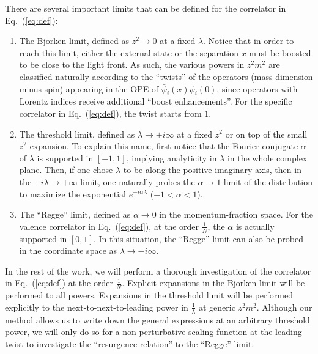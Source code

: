 \documentclass[a4paper,11pt]{article}
\begin{document}
There are several important limits that can be defined for the correlator in Eq.~(\ref{eq:def}):
\begin{enumerate}
    \item The Bjorken limit, defined as $z^2 \rightarrow 0$ at a fixed $\lambda$. Notice that in order to reach this limit, either the external state or the separation $x$ must be boosted to be close to the light front. As such, the various powers in $z^2m^2$ are classified naturally according to the ``twists'' of the operators (mass dimension minus spin) appearing in the OPE of $\bar \psi_i(x)\psi_i(0)$, since operators with Lorentz indices receive additional ``boost enhancements''. For the specific correlator in Eq.~(\ref{eq:def}), the twist starts from $1$. 
    \item The threshold limit, defined as $\lambda \rightarrow +i\infty$ at a fixed $z^2$ or on top of the small $z^2$ expansion. To explain this name, first notice that the Fourier conjugate $\alpha$ of $\lambda$ is supported in $[-1,1]$, implying analyticity in $\lambda$ in the whole complex plane. Then, if one chose $\lambda$ to be along the positive imaginary axis, then in the $-i\lambda \rightarrow +\infty$ limit,  one naturally probes the $\alpha \rightarrow 1$ limit of the distribution to maximize the exponential $e^{-i\alpha \lambda}$ ($-1<\alpha<1$). 
    \item The ``Regge'' limit, defined as $\alpha \rightarrow 0$ in the momentum-fraction space. For the valence correlator in Eq.~(\ref{eq:def}), at the order $\frac{1}{N}$, the $\alpha$ is actually supported in $[0,1]$. In this situation, the ``Regge'' limit can also be probed in the coordinate space as $\lambda \rightarrow -i\infty$. 
\end{enumerate}
In the rest of the work, we will perform a thorough investigation of the correlator in Eq.~(\ref{eq:def}) at the order $\frac{1}{N}$. Explicit expansions in the Bjorken limit will be performed to all powers. Expansions in the threshold limit will be performed explicitly to the next-to-next-to-leading power in $\frac{1}{\lambda}$ at generic $z^2m^2$. Although our method allows us to write down the general expressions at an arbitrary threshold power, we will only do so for a non-perturbative scaling function at the leading twist to investigate the ``resurgence relation'' to the ``Regge'' limit. 
\end{document}
